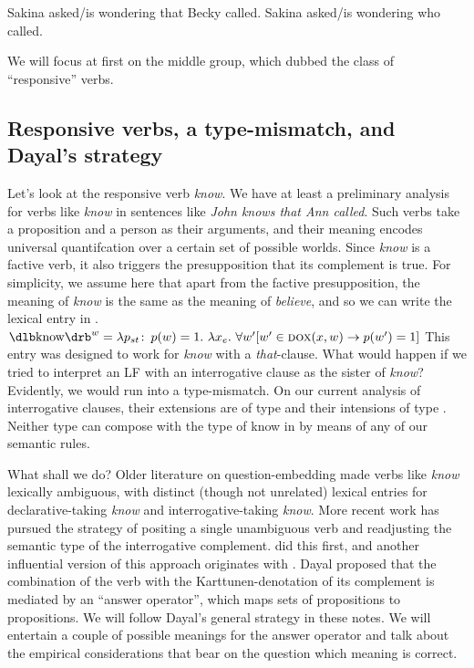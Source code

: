 \pex
\a *Sakina asked/is wondering that Becky called.
\a Sakina asked/is wondering who called.
\xe

We will focus at first on the middle group, which
\cite{lahiri-2002-questions-book} dubbed the class of ``responsive'' verbs.

\subsection{Responsive verbs, a type-mismatch, and Dayal's strategy}
\label{sec:responsive-verbs}

Let's look at the responsive verb \emph{know}. We have at least a preliminary
analysis for verbs like \emph{know} in sentences like \emph{John knows that Ann
  called}. Such verbs take a proposition and a person as their arguments, and
their meaning encodes universal quantifcation over a certain set of possible
worlds. Since \emph{know} is a factive verb, it also triggers the presupposition
that its complement is true. For simplicity, we assume here that apart from the
factive presupposition, the meaning of \emph{know} is the same as the meaning of
\emph{believe}, and so we can write the lexical entry in \Next.
%
\ex%
%
$\svt{know}^{w} = \lambda p_{st}\co p(w)=1.\ \lambda x_{e}.\ \forall w' [w'\in \dox(x,w) \rightarrow p(w')=1]$
\xe
%
This entry was designed to work for \emph{know} with a \emph{that}-clause. What
would happen if we tried to interpret an LF with an interrogative clause as the
sister of \emph{know}? Evidently, we would run into a type-mismatch. On our
current analysis of interrogative clauses, their extensions are of type
 and their intensions of type . Neither type can
compose with the type of know in \Last by means of any of our semantic rules.

What shall we do? Older literature on question-embedding made verbs like
\emph{know} lexically ambiguous, with distinct (though not unrelated) lexical
entries for declarative-taking \emph{know} and interrogative-taking \emph{know}.
More recent work has pursued the strategy of positing a single unambiguous verb
and readjusting the semantic type of the interrogative complement.
\cite{groenendijk-stokhof-1982-wh-complements} did this first, and another
influential version of this approach originates with
\cite{dayal-1996-locality-wh}. Dayal proposed that the combination of the verb
with the Karttunen-denotation of its complement is mediated by an ``answer
operator'', which maps sets of propositions to propositions. We will follow
Dayal's general strategy in these notes. We will entertain a couple of possible
meanings for the answer operator and talk about the empirical considerations
that bear on the question which meaning is correct.

